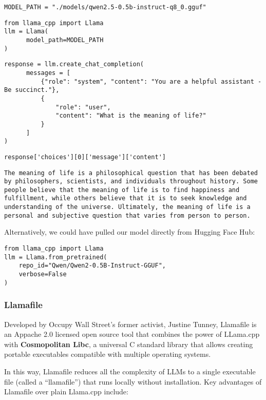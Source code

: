 \begin{verbatim}
MODEL_PATH = "./models/qwen2.5-0.5b-instruct-q8_0.gguf"
\end{verbatim}

\begin{verbatim}
from llama_cpp import Llama
llm = Llama(
      model_path=MODEL_PATH
)
\end{verbatim}

\begin{verbatim}
response = llm.create_chat_completion(
      messages = [
          {"role": "system", "content": "You are a helpful assistant - Be succinct."},
          {
              "role": "user",
              "content": "What is the meaning of life?"
          }
      ]
)
\end{verbatim}

\begin{verbatim}
response['choices'][0]['message']['content']
\end{verbatim}

\begin{verbatim}The meaning of life is a philosophical question that has been debated by philosophers, scientists, and individuals throughout history. Some people believe that the meaning of life is to find happiness and fulfillment, while others believe that it is to seek knowledge and understanding of the universe. Ultimately, the meaning of life is a personal and subjective question that varies from person to person.
\end{verbatim}

Alternatively, we could have pulled our model directly from Hugging Face Hub:

\begin{verbatim}
from llama_cpp import Llama
llm = Llama.from_pretrained(
    repo_id="Qwen/Qwen2-0.5B-Instruct-GGUF",
    verbose=False
)
\end{verbatim}
\subsubsection{Llamafile}

Developed by Occupy Wall Street's former activist, Justine Tunney, Llamafile  is an Appache 2.0 licensed open source tool that combines the power of LLama.cpp with \textbf{Cosmopolitan Libc}, a universal C standard library that allows creating portable executables compatible with multiple operating systems.

In this way, Llamafile reduces all the complexity of LLMs to a single executable file (called a ``llamafile'') that runs locally without installation. Key advantages of Llamafile over plain Llama.cpp include:

